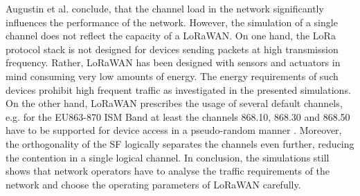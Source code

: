 \documentclass{article}
\begin{document}
Augustin et al. conclude, that the channel load in the network significantly
influences the performance of the network. However, the simulation of a single
channel does not reflect the capacity of a LoRaWAN. On one hand, the LoRa
protocol stack is not designed for devices sending packets at high transmission
frequency. Rather, LoRaWAN has been designed with sensors and actuators in mind
consuming very low amounts of energy. The energy requirements of such devices
prohibit high frequent traffic as investigated in the presented simulations. On
the other hand, LoRaWAN prescribes the usage of several default channels, e.g.
for the EU863-870 ISM Band at least the channels 868.10, 868.30 and 868.50 have
to be supported for device access in a pseudo-random manner \cite{lorawanspec,
lorawanregparams}. Moreover, the orthogonality of the SF logically separates
the channels even further, reducing the contention in a single logical channel.
In conclusion, the simulations still shows that network operators have to
analyse the traffic requirements of the network and choose the operating
parameters of LoRaWAN carefully.
\end{document}
